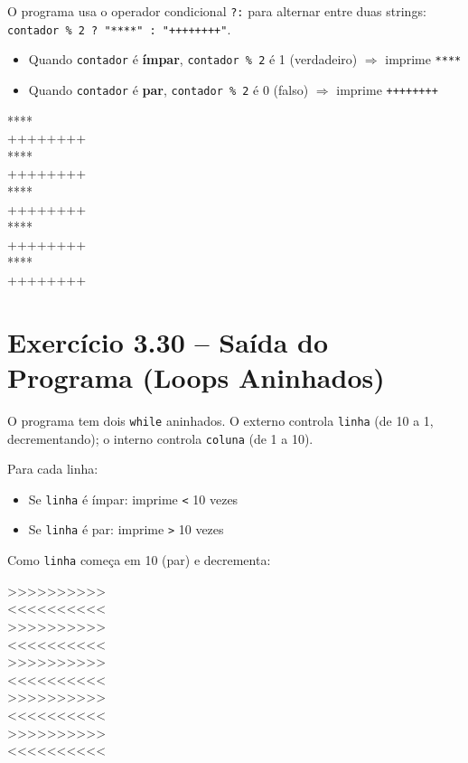 \documentclass[12pt,a4paper]{article}
\begin{document}
\begin{respostabox}
O programa usa o operador condicional \texttt{?:} para alternar entre duas strings:
\texttt{contador \% 2 ? "****" : "++++++++"}.

\begin{itemize}[noitemsep]
  \item Quando \texttt{contador} é \textbf{ímpar}, \texttt{contador \% 2} é 1
  (verdadeiro) $\Rightarrow$ imprime \texttt{****}
  \item Quando \texttt{contador} é \textbf{par}, \texttt{contador \% 2} é 0
  (falso) $\Rightarrow$ imprime \texttt{++++++++}
\end{itemize}

\begin{saida}
****\\
++++++++\\
****\\
++++++++\\
****\\
++++++++\\
****\\
++++++++\\
****\\
++++++++
\end{saida}
\end{respostabox}

\section{Exercício 3.30 -- Saída do Programa (Loops Aninhados)}

\begin{respostabox}
O programa tem dois \texttt{while} aninhados. O externo controla \texttt{linha}
(de 10 a 1, decrementando); o interno controla \texttt{coluna} (de 1 a 10).

Para cada linha:
\begin{itemize}[noitemsep]
  \item Se \texttt{linha} é ímpar: imprime \texttt{<} 10 vezes
  \item Se \texttt{linha} é par: imprime \texttt{>} 10 vezes
\end{itemize}

Como \texttt{linha} começa em 10 (par) e decrementa:

\begin{saida}
{>}{>}{>}{>}{>}{>}{>}{>}{>}{>}\\
{<}{<}{<}{<}{<}{<}{<}{<}{<}{<}\\
{>}{>}{>}{>}{>}{>}{>}{>}{>}{>}\\
{<}{<}{<}{<}{<}{<}{<}{<}{<}{<}\\
{>}{>}{>}{>}{>}{>}{>}{>}{>}{>}\\
{<}{<}{<}{<}{<}{<}{<}{<}{<}{<}\\
{>}{>}{>}{>}{>}{>}{>}{>}{>}{>}\\
{<}{<}{<}{<}{<}{<}{<}{<}{<}{<}\\
{>}{>}{>}{>}{>}{>}{>}{>}{>}{>}\\
{<}{<}{<}{<}{<}{<}{<}{<}{<}{<}
\end{saida}
\end{respostabox}
\end{document}
